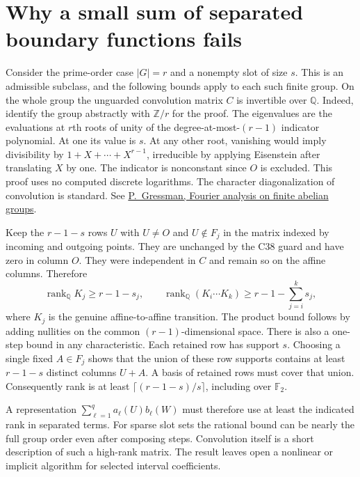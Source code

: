 \documentclass[11pt]{article}
\begin{document}
\section{Why a small sum of separated boundary functions fails}
Consider the prime-order case $|G|=r$ and a nonempty slot of size
$s$. This is an admissible subclass, and the following bounds apply to
each such finite group. On the whole group the unguarded convolution
matrix $C$ is invertible over $\mathbb Q$. Indeed, identify the group
abstractly with $\mathbb Z/r$ for the proof. The eigenvalues are the
evaluations at $r$th roots of unity of the degree-at-most-$(r-1)$
indicator polynomial. At one its value is $s$. At any other root,
vanishing would imply divisibility by $1+X+\cdots+X^{r-1}$, irreducible
by applying Eisenstein after translating $X$ by one. The indicator is
nonconstant since $O$ is excluded. This proof uses no computed discrete
logarithms. The character diagonalization of convolution is standard.
See \href{https://www2.math.upenn.edu/~gressman/analysis/14-discrete.html}
{P.\ Gressman, Fourier analysis on finite abelian groups}.

Keep the $r-1-s$ rows $U$ with $U\ne O$ and $U\notin F_j$ in the
matrix indexed by incoming and outgoing points. They are unchanged by
the C38 guard and have zero in column $O$. They were independent in
$C$ and remain so on the affine columns. Therefore
\[
 \operatorname{rank}_{\mathbb Q} K_j \ge r-1-s_j,\qquad
 \operatorname{rank}_{\mathbb Q}(K_i\cdots K_k)
 \ge r-1-\sum_{j=i}^k s_j ,
\]
where $K_j$ is the genuine affine-to-affine transition. The product
bound follows by adding nullities on the common $(r-1)$-dimensional
space. There is also a one-step bound in any characteristic. Each
retained row has support $s$. Choosing a single fixed $A\in F_j$ shows
that the union of these row supports contains at least $r-1-s$ distinct
columns $U+A$. A basis of retained rows must cover that union.
Consequently rank is at least $\lceil(r-1-s)/s\rceil$, including
over $\mathbb F_2$.

A representation $\sum_{\ell=1}^q a_\ell(U)b_\ell(W)$ must therefore
use at least the indicated rank in separated terms. For sparse slot sets
the rational bound can be nearly the full group order even after
composing steps. Convolution itself is a short description of such a
high-rank matrix. The result leaves open a nonlinear or implicit
algorithm for selected interval coefficients.
\end{document}
